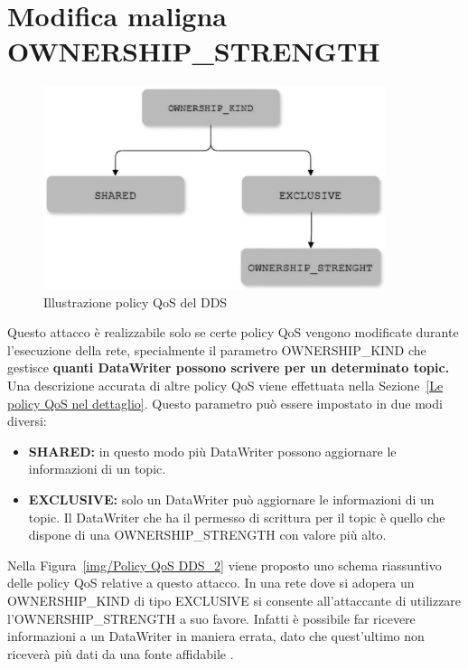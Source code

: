 \section{Modifica maligna OWNERSHIP\_STRENGTH}

\begin{figure}[H]
    \centering
    \includegraphics[width=10cm, keepaspectratio]{img/Policy QoS DDS_2.jpg}
    \caption{Illustrazione policy QoS del DDS}\label{Mappa QoS}
\end{figure}
\label{img/Policy QoS DDS_2}


Questo attacco è realizzabile solo se certe policy QoS vengono
modificate durante l'esecuzione della rete, specialmente il parametro
OWNERSHIP\_KIND che gestisce \textbf{quanti DataWriter possono scrivere per un
determinato topic.} Una descrizione accurata di altre policy QoS viene 
effettuata nella Sezione~\ref{Le policy QoS nel dettaglio}.
Questo parametro può essere impostato in due modi diversi:
\begin{itemize}
    \item \textbf{SHARED:} in questo modo più DataWriter possono aggiornare le
    informazioni di un topic.
    \item \textbf{EXCLUSIVE:} solo un DataWriter può aggiornare le informazioni di un
    topic. Il DataWriter che ha il permesso di scrittura per il topic è quello
    che dispone di una OWNERSHIP\_STRENGTH con valore più alto.
\end{itemize}
Nella Figura~\ref{img/Policy QoS DDS_2} viene proposto uno schema riassuntivo
delle policy QoS relative a questo attacco.
In una rete dove si adopera un OWNERSHIP\_KIND di tipo EXCLUSIVE
si consente
all'attaccante di utilizzare l'OWNERSHIP\_STRENGTH a suo favore.
Infatti è possibile far ricevere informazioni a un DataWriter
in maniera errata, dato che quest'ultimo non riceverà più dati da
una fonte affidabile 
\cite{DBLP:conf/malware/MichaudDL18}.


